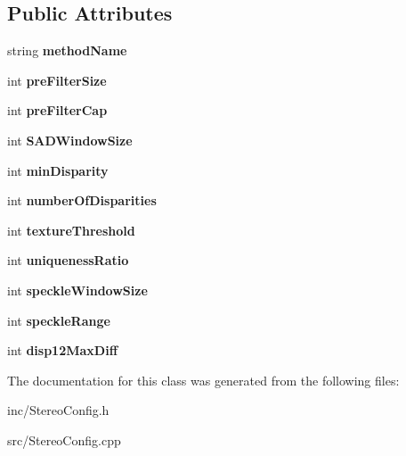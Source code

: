 \subsection*{Public Attributes}
\begin{DoxyCompactItemize}
\item 
string {\bfseries method\+Name}\hypertarget{class_stereo_config_ad307276f72bf2fbd0592437ce134d9b4}{}\label{class_stereo_config_ad307276f72bf2fbd0592437ce134d9b4}

\item 
int {\bfseries pre\+Filter\+Size}\hypertarget{class_stereo_config_a9a4278d21c09da39d7456a5977928c50}{}\label{class_stereo_config_a9a4278d21c09da39d7456a5977928c50}

\item 
int {\bfseries pre\+Filter\+Cap}\hypertarget{class_stereo_config_af6a5e6526165d701c448b591d3f0de43}{}\label{class_stereo_config_af6a5e6526165d701c448b591d3f0de43}

\item 
int {\bfseries S\+A\+D\+Window\+Size}\hypertarget{class_stereo_config_a9c877cdffa37e19840f4a18dc6a54f6d}{}\label{class_stereo_config_a9c877cdffa37e19840f4a18dc6a54f6d}

\item 
int {\bfseries min\+Disparity}\hypertarget{class_stereo_config_ad0897ddeb960edeb39a1fe735fa48390}{}\label{class_stereo_config_ad0897ddeb960edeb39a1fe735fa48390}

\item 
int {\bfseries number\+Of\+Disparities}\hypertarget{class_stereo_config_afa6a69b53d552a8acaefb440742eb5af}{}\label{class_stereo_config_afa6a69b53d552a8acaefb440742eb5af}

\item 
int {\bfseries texture\+Threshold}\hypertarget{class_stereo_config_a70bc91fd99847fb814bbc21deb436b3b}{}\label{class_stereo_config_a70bc91fd99847fb814bbc21deb436b3b}

\item 
int {\bfseries uniqueness\+Ratio}\hypertarget{class_stereo_config_a367ae211dc949080777958e67ad389d7}{}\label{class_stereo_config_a367ae211dc949080777958e67ad389d7}

\item 
int {\bfseries speckle\+Window\+Size}\hypertarget{class_stereo_config_ae37d8112b7ed2fd319121a03518dcedc}{}\label{class_stereo_config_ae37d8112b7ed2fd319121a03518dcedc}

\item 
int {\bfseries speckle\+Range}\hypertarget{class_stereo_config_af18849575709c1e7b073fa8660595188}{}\label{class_stereo_config_af18849575709c1e7b073fa8660595188}

\item 
int {\bfseries disp12\+Max\+Diff}\hypertarget{class_stereo_config_a041155ce140283dde736e3a3f4022c23}{}\label{class_stereo_config_a041155ce140283dde736e3a3f4022c23}

\end{DoxyCompactItemize}


The documentation for this class was generated from the following files\+:\begin{DoxyCompactItemize}
\item 
inc/Stereo\+Config.\+h\item 
src/Stereo\+Config.\+cpp\end{DoxyCompactItemize}
